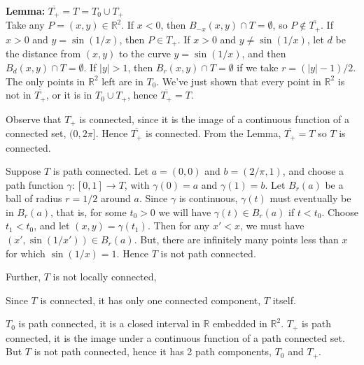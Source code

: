 \documentclass[minion]{homework651}
\newcommand{\RR}{\mathbb{R}}
\newcommand{\ra}{\rightarrow}
\newcommand{\NN}{\mathbb{N}}
\begin{document}
\begin{aproblems}
\textbf{Lemma:} \textit{$\overline{T_+}=T=T_0 \cup T_+$}\\
Take any $P=(x,y)\in\RR^2$.  If $x<0$, then $B_{-x}(x,y)\cap T=\emptyset$, so
$P\not\in\overline{T_+}$.  If $x>0$ and $y=\sin(1/x)$, then $P\in T_+$.
If $x>0$ and $y\ne \sin(1/x)$, let $d$ be the distance from $(x,y)$ to the
curve $y=\sin(1/x)$, and then $B_d(x,y)\cap T=\emptyset$.
If $|y|>1$, then $B_r(x,y)\cap T=\emptyset$ if we take
$r=(|y|-1)/2$.  The only points in $\RR^2$ left are in $T_0$.  We've just
shown that every point in $\RR^2$ is not in $\overline{T_+}$, or it is
in $T_0\cup T_+$, hence $\overline{T_+}=T$.

\subsol
Observe that $T_+$ is connected, since it is the image of a continuous
function of a connected set, $(0,2\pi]$.  Hence $\overline{T_+}$ is
connected. From the Lemma, $\overline{T_+}=T$ so $T$ is connected.

Suppose $T$ is path connected. Let $a=(0,0)$ and $b=(2/\pi,1)$, and
choose a path function $\gamma:[0,1]\ra T$,
with $\gamma(0)=a$ and $\gamma(1)=b$.  Let $B_r(a)$ be a ball of
radius $r=1/2$ around $a$.
Since $\gamma$ is continuous, $\gamma(t)$ must eventually be in $B_r(a)$,
that is, for some $t_0>0$ we will have $\gamma(t)\in B_r(a)$ if $t<t_0$.
Choose $t_1<t_0$, and let $(x,y)=\gamma(t_1)$.  Then for any $x'<x$, we
must have $(x',\sin(1/x'))\in B_r(a)$.  But, there
are infinitely many points less than $x$ for which $\sin(1/x)=1$.  Hence
$T$ is not path connected.

Further, $T$ is not locally connected, 

\subsol
Since $T$ is connected, it has only one connected component, $T$ itself.

$T_0$ is path connected, it is a closed interval in $\RR$ embedded in $\RR^2$.
$T_+$ is path connected, it is the image under a continuous function of a
path connected set.  But $T$ is not path connected, hence it has 2 path
components, $T_0$ and $T_+$.

\end{aproblems}
\end{document}
